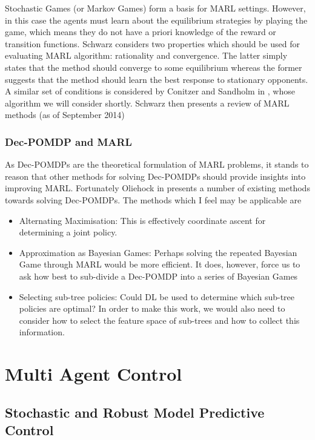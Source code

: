 \documentclass[preprint,11pt]{report}
\begin{document}
Stochastic Games (or Markov Games) form a basis for MARL settings. However, in this case the agents
must learn about the equilibrium strategies by playing the game, which means they do not have a
priori knowledge of the reward or transition functions. Schwarz considers two properties which
should be used for evaluating MARL algorithm: rationality and convergence. The latter simply states
that the method should converge to some equilibrium whereas the former suggests that the method
should learn the best response to stationary opponents. A similar set of conditions is considered by
Conitzer and Sandholm in \cite{ConitzerAWESOME:}, whose algorithm we will consider shortly. Schwarz
then presents a review of MARL methods (as of September 2014) 

\subsection*{Dec-POMDP and MARL}

As Dec-POMDPs are the theoretical formulation of MARL problems, it stands to reason that other
methods for solving Dec-POMDPs should provide insights into improving MARL. Fortunately Oliehock in
\cite{OliehoekDecentralizedPOMDPs} presents a number of existing methods towards solving Dec-POMDPs.
The methods which I feel may be applicable are  \begin{itemize} \item Alternating Maximisation: This
is effectively coordinate ascent for determining a joint policy. \item Approximation as Bayesian
Games: Perhaps solving the repeated Bayesian Game through MARL would be more efficient. It does,
however, force us to ask how best to sub-divide a Dec-POMDP into a series of Bayesian Games  \item
Selecting sub-tree policies: Could DL be used to determine which sub-tree policies are optimal? In
order to make this work, we would also need to consider how to select the feature space of sub-trees
and how to collect this information. \end{itemize}

\chapter{Multi Agent Control}

\section{Stochastic and Robust Model Predictive Control}
\end{document}
